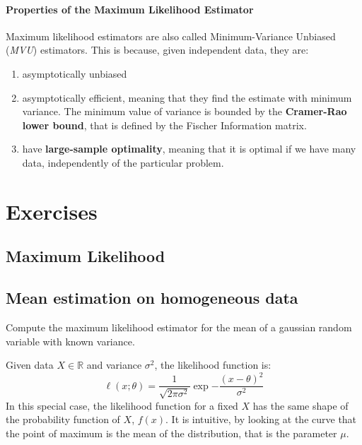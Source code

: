 \paragraph*{Properties of the Maximum Likelihood Estimator}
Maximum likelihood estimators are also called Minimum-Variance Unbiased (\textit{MVU}) estimators. This is because, given independent data, they are:
\begin{enumerate}
    \item asymptotically unbiased
    \item asymptotically efficient, meaning that they find the estimate with minimum variance. The minimum value of variance is bounded by the \textbf{Cramer-Rao lower bound}, that is defined by the Fischer Information matrix.
    \item have \textbf{large-sample optimality}, meaning that it is optimal if we have many data, independently of the particular problem.
\end{enumerate}


\section{Exercises}
\subsection{Maximum Likelihood}
\subsection{Mean estimation on homogeneous data}
\begin{exercise}
    Compute the maximum likelihood estimator for the mean of a gaussian random variable with known variance.
\end{exercise}
Given data $X \in \mathbb{R}$ and variance $\sigma^2$, the likelihood function is:
\[
    \ell(x;\theta) = \frac{1}{\sqrt{2\pi\sigma^2}} \exp{-\frac{(x-\theta)^2}{\sigma^2}}
\]
In this special case, the likelihood function for a fixed $X$ has the same shape of the probability function of $X$, $f(x)$. 
It is intuitive, by looking at the curve that the point of maximum is the mean of the distribution, that is the parameter $\mu$.

